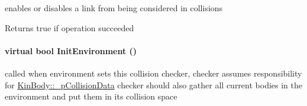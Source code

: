 \label{classOpenRAVE_1_1CollisionCheckerBase_aad5eb39360dbde52e90efd9f2a466ab4}
enables or disables a link from being considered in collisions \begin{DoxyReturn}{Returns}
true if operation succeeded 
\end{DoxyReturn}
\hypertarget{classOpenRAVE_1_1CollisionCheckerBase_a253ffd76b6c58523ff7813a7e777cce0}{
\paragraph[{InitEnvironment}]{\setlength{\rightskip}{0pt plus 5cm}virtual bool InitEnvironment ()}\hfill}
\label{classOpenRAVE_1_1CollisionCheckerBase_a253ffd76b6c58523ff7813a7e777cce0}
called when environment sets this collision checker, checker assumes responsibility for \hyperlink{classOpenRAVE_1_1KinBody_a0a17ef574c66277ef313e5e56d6b9bbc}{KinBody::\_\-pCollisionData} checker should also gather all current bodies in the environment and put them in its collision space 